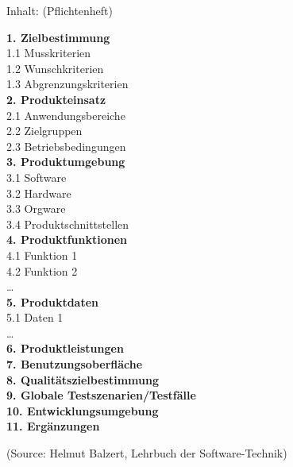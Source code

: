 
\newpage
Inhalt: (Pflichtenheft)
\begin{tabbing}
{\bfseries\large 1. Zielbestimmung}\\
1.1 Musskriterien \\
1.2 Wunschkriterien\\
1.3 Abgrenzungskriterien\\
{\bfseries\large 2. Produkteinsatz} \\
2.1 Anwendungsbereiche \\
2.2 Zielgruppen \\
2.3 Betriebsbedingungen\\
{\bfseries\large 3. Produktumgebung} \\
3.1 Software\\
3.2 Hardware\\
3.3 Orgware\\
3.4 Produktschnittstellen\\
\newslide
{\bfseries\large 4. Produktfunktionen} \\
4.1 Funktion 1\\
4.2 Funktion 2\\
\ldots\\

{\bfseries\large 5. Produktdaten} \\
5.1 Daten 1\\
\ldots\\

{\bfseries\large 6. Produktleistungen} \\
{\bfseries\large 7. Benutzungsoberfläche} \\
{\bfseries\large 8. Qualitätszielbestimmung} \\
{\bfseries\large 9. Globale Testszenarien/Testfälle} \\
{\bfseries\large 10. Entwicklungsumgebung} \\
{\bfseries\large 11. Ergänzungen} \\
\end{tabbing}
(Source: Helmut Balzert, Lehrbuch der Software-Technik)

